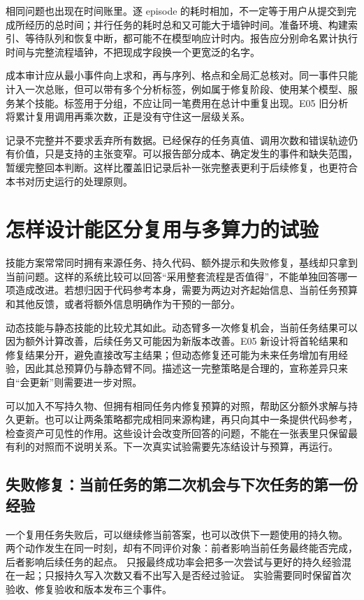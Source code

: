 相同问题也出现在时间账里。逐 episode 的耗时相加，不一定等于用户从提交到完成所经历的总时间；并行任务的耗时总和又可能大于墙钟时间。准备环境、构建索引、等待队列和恢复中断，都可能不在模型响应计时内。报告应分别命名累计执行时间与完整流程墙钟，不把现成字段换一个更宽泛的名字。

成本审计应从最小事件向上求和，再与序列、格点和全局汇总核对。同一事件只能计入一次总账，但可以带有多个分析标签，例如属于修复阶段、使用某个模型、服务某个技能。标签用于分组，不应让同一笔费用在总计中重复出现。E05 旧分析将累计复用调用再乘次数，正是没有守住这一层级关系。

记录不完整并不要求丢弃所有数据。已经保存的任务真值、调用次数和错误轨迹仍有价值，只是支持的主张变窄。可以报告部分成本、确定发生的事件和缺失范围，暂缓完整回本判断。这样比覆盖旧记录后补一张完整表更利于后续修复，也更符合本书对历史运行的处理原则。


\section{怎样设计能区分复用与多算力的试验}
\label{sec:ch08-next-design}

技能方案常常同时拥有来源任务、持久代码、额外提示和失败修复，基线却只拿到当前问题。这样的系统比较可以回答“采用整套流程是否值得”，不能单独回答哪一项造成改进。若想归因于代码参考本身，需要为两边对齐起始信息、当前任务预算和其他反馈，或者将额外信息明确作为干预的一部分。

动态技能与静态技能的比较尤其如此。动态臂多一次修复机会，当前任务结果可以因为额外计算改善，后续任务又可能因为新版本改善。E05 新设计将首轮结果和修复结果分开，避免直接改写主结果；但动态修复还可能为未来任务增加有用经验，因此其总预算仍与静态臂不同。描述这一完整策略是合理的，宣称差异只来自“会更新”则需要进一步对照。

可以加入不写持久物、但拥有相同任务内修复预算的对照，帮助区分额外求解与持久更新。也可以让两条策略都完成相同来源构建，再只向其中一条提供代码参考，检查资产可见性的作用。这些设计会改变所回答的问题，不能在一张表里只保留最有利的对照而不说明关系。下一次真实试验需要先冻结设计与预算，再运行。

\subsection{失败修复：当前任务的第二次机会与下次任务的第一份经验}

一个复用任务失败后，可以继续修当前答案，也可以改供下一题使用的持久物。
两个动作发生在同一时刻，却有不同评价对象：前者影响当前任务最终能否完成，后者影响后续任务的起点。
只报最终成功率会把多一次尝试与更好的持久经验混在一起；只报持久写入次数又看不出写入是否经过验证。
实验需要同时保留首次验收、修复验收和版本发布三个事件。

